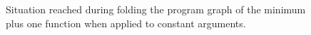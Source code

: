 \begin{figure}[htbp]
	\centering
	\qquad
	\caption{Situation reached during folding the program graph of the minimum plus one function when applied to constant arguments.}
	\label{fig:cmpcondfold}
\end{figure}

